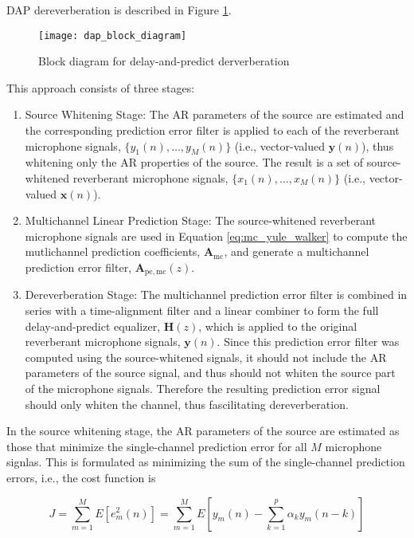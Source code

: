 DAP dereverberation is described in Figure \ref{fig:dap_block_diagram}. 

\begin{figure}[H]
	\texttt{[image: dap\_block\_diagram]}
	\centering
	\caption{Block diagram for delay-and-predict derverberation \citep{triki2006delay}}
	\label{fig:dap_block_diagram}
\end{figure}


This approach consists of three stages:

\begin{enumerate}
	\item Source Whitening Stage: The AR parameters of the source are estimated and the corresponding prediction error filter is applied to each of the reverberant microphone signals, $\{y_1(n), \dots, y_M(n)\}$ (i.e., vector-valued $\boldsymbol{y}(n)$), thus whitening only the AR properties of the source. The result is a set of source-whitened reverberant microphone signals, $\{x_1(n), \dots, x_M(n)\}$ (i.e., vector-valued $\boldsymbol{x}(n)$).
	\item Multichannel Linear Prediction Stage: The source-whitened reverberant microphone signals are used in Equation \ref{eq:mc_yule_walker} to compute the mutlichannel prediction coefficients, $\boldsymbol{A}_{\mathrm{mc}}$, and generate a multichannel prediction error filter, $\boldsymbol{A}_{\mathrm{pe,mc}}(z)$.
	\item Dereverberation Stage: The multichannel prediction error filter is combined in series with a time-alignment filter and a linear combiner to form the full delay-and-predict equalizer, $\boldsymbol{H}(z)$, which is applied to the original reverberant microphone signals, $\boldsymbol{y}(n)$. Since this prediction error filter was computed using the source-whitened signals, it should not include the AR parameters of the source signal, and thus should not whiten the source part of the microphone signals. Therefore the resulting prediction error signal should only whiten the channel, thus fascilitating dereverberation.
\end{enumerate}

In the source whitening stage, the AR parameters of the source are estimated as those that minimize the single-channel prediction error for all $M$ microphone signlas. This is formulated as minimizing the sum of the single-channel prediction errors, i.e., the cost function is

\begin{equation}
	J = \sum_{m=1}^{M} E[ e_m^2(n) ] = \sum_{m=1}^{M} E[ y_m(n) - \sum_{k=1}^{p} \alpha_k y_m(n-k) ]
\end{equation}

